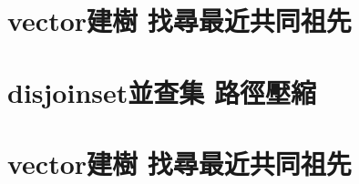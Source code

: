 \documentclass{article}
\begin{document}
\tableofcontents  %
\newpage  %
\begin{multicols}{2}

\section{vector建樹 找尋最近共同祖先}



\section{disjoinset並查集 路徑壓縮}



\section{vector建樹 找尋最近共同祖先}



\end{multicols}
\end{document}
